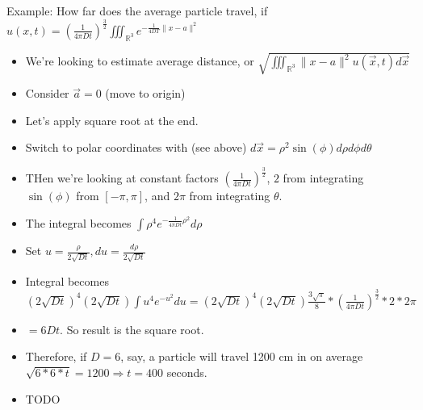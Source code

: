 \documentclass[11pt, oneside]{article}   	%
\begin{document}
Example: How far does the average particle travel, if $u(x,t) = (\frac{1}{4\pi D t})^{\frac{3}{2} }\iiint_{\mathbb{R}^3} e^{-\frac{1}{4DT} \|x-a\|^2}$ 
\begin{itemize}
\item We're looking to estimate average distance, or $\sqrt{\iiint_{\mathbb{R}^3} \|x - a\|^2 u(\vec{x},t) d\vec{x}}$
\item Consider $\vec{a} = 0$ (move to origin)
\item Let's apply square root at the end.
\item Switch to polar coordinates with (see above) $d\vec{x}=\rho^2 \sin(\phi) d\rho d\phi d\theta$
\item THen we're looking at constant factors $(\frac{1}{4\pi D t})^{\frac{3}{2}}$, $2$ from integrating $\sin(\phi)$ from $[-\pi, \pi]$, and $2\pi$ from integrating $\theta$.
\item The integral becomes $\int \rho^4 e^{-\frac{1}{4\pi D t} \rho^2} d\rho$
\item Set $u = \frac{\rho}{2\sqrt{Dt}}, du = \frac{d\rho}{2\sqrt{Dt}}$
\item Integral becomes $(2\sqrt{Dt})^4 (2\sqrt{Dt}) \int u^4e^{-u^2}du = (2\sqrt{Dt})^4 (2\sqrt{Dt}) \frac{3\sqrt{\pi}}{8} * (\frac{1}{4\pi D t})^{\frac{3}{2}} * 2 * 2\pi$
\item $=6Dt$. So result is the square root.
\item Therefore, if $D=6$, say, a particle will travel 1200 cm in on average $\sqrt{6*6*t} = 1200 \Rightarrow t = 400$  seconds.
\end{itemize}


\begin{itemize}
\item TODO
\end{itemize}
\end{document}
